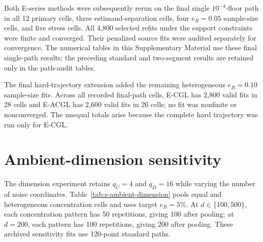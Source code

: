 \documentclass[preprint,12pt,authoryear]{elsarticle}
\begin{document}
Both E-series methods were subsequently rerun on the final single
$10^{-4}$-floor path in all 12 primary cells, three estimand-separation cells,
four $e_B=0.05$ sample-size cells, and five stress cells. All 4,800 selected
refits under the support constraints were finite and converged. Their
penalized source fits were audited separately for convergence. The numerical
tables in this Supplementary Material use these final single-path results;
the preceding standard and two-segment results are retained only in the
path-audit tables.

The final hard-trajectory extension added the remaining heterogeneous
$e_B=0.10$ sample-size fits. Across all recorded final-path cells, E-CGL has
2,800 valid fits in 28 cells and E-ACGL has 2,600 valid fits in 26 cells; no
fit was nonfinite or nonconverged. The unequal totals arise because the
complete hard trajectory was run only for E-CGL.

\section{Ambient-dimension sensitivity}
\label{sec:s-ambient-dimension}

The dimension experiment retains $q_C=4$ and $q_D=16$ while varying the number
of noise coordinates. Table~\ref{tab:s-ambient-dimension} pools equal and heterogeneous
concentration cells and uses target $e_B=5\%$. At $d\in\{100,500\}$, each
concentration pattern has 50 repetitions, giving 100 after pooling; at $d=200$,
each pattern has 100 repetitions, giving 200 after pooling. These archived
sensitivity fits use 120-point standard paths.
\end{document}
